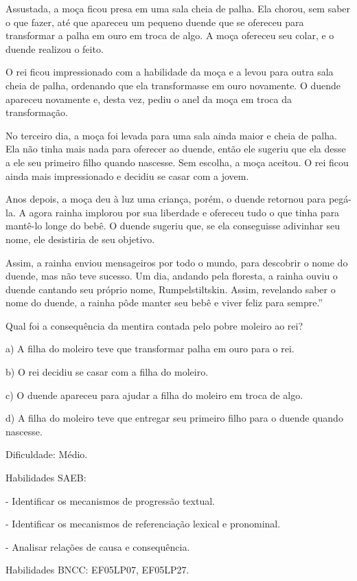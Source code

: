 Assustada, a moça ficou presa em uma sala cheia de palha. Ela chorou,
sem saber o que fazer, até que apareceu um pequeno duende que se
ofereceu para transformar a palha em ouro em troca de algo. A moça
ofereceu seu colar, e o duende realizou o feito.

O rei ficou impressionado com a habilidade da moça e a levou para outra
sala cheia de palha, ordenando que ela transformasse em ouro novamente.
O duende apareceu novamente e, desta vez, pediu o anel da moça em troca
da transformação.

No terceiro dia, a moça foi levada para uma sala ainda maior e cheia de
palha. Ela não tinha mais nada para oferecer ao duende, então ele
sugeriu que ela desse a ele seu primeiro filho quando nascesse. Sem
escolha, a moça aceitou. O rei ficou ainda mais impressionado e decidiu
se casar com a jovem.

Anos depois, a moça deu à luz uma criança, porém, o duende retornou para
pegá-la. A agora rainha implorou por sua liberdade e ofereceu tudo o que
tinha para mantê-lo longe do bebê. O duende sugeriu que, se ela
conseguisse adivinhar seu nome, ele desistiria de seu objetivo.

Assim, a rainha enviou mensageiros por todo o mundo, para descobrir o
nome do duende, mas não teve sucesso. Um dia, andando pela floresta, a
rainha ouviu o duende cantando seu próprio nome, Rumpelstiltskin. Assim,
revelando saber o nome do duende, a rainha pôde manter seu bebê e viver
feliz para sempre.''

Qual foi a consequência da mentira contada pelo pobre moleiro ao rei?

a) A filha do moleiro teve que transformar palha em ouro para o rei.

b) O rei decidiu se casar com a filha do moleiro.

c) O duende apareceu para ajudar a filha do moleiro em troca de algo.

d) A filha do moleiro teve que entregar seu primeiro filho para o duende
quando nascesse.

Dificuldade: Médio.

Habilidades SAEB:

- Identificar os mecanismos de progressão textual.

- Identificar os mecanismos de referenciação lexical e pronominal.

- Analisar relações de causa e consequência.

Habilidades BNCC: EF05LP07, EF05LP27.

